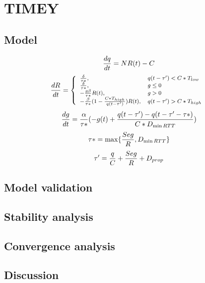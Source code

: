 \section{TIMEY}

\subsection{Model}

\begin{equation}
\small
\frac{{dq}}{{dt}} = NR(t) - C\\
\label{eq:timely_q}
\end{equation}
\begin{equation}
\small
\frac{{dR}}{{dt}} = \left\{ \begin{array}{ll}
\frac{\delta }{{\tau *}}, & q(t - \tau ') < C*{T_{low}}\\
\frac{\delta }{{\tau *}}, & g \le 0\\
 - \frac{{g\beta }}{{\tau *}}R(t), & g > 0\\
 - \frac{\beta }{{\tau *}}(1 - \frac{{C*{T_{high}}}}{{q(t - \tau ')}})R(t), & q(t - \tau ') > C*{T_{high}}
\end{array} \right.\\
\label{eq:timely_r}
\end{equation}
\begin{equation}
\small
\frac{{dg}}{{dt}} = \frac{\alpha }{{\tau *}}( - g(t) + \frac{{q(t - \tau ') - q(t - \tau ' - \tau *)}}{{C*{D_{\min RTT}}}})\\
\label{eq:timely_g}
\end{equation}
\begin{equation}
\small
\tau * = \max \{ \frac{{Seg}}{R},{D_{\min RTT}}\} \\
\label{eq:timely_taus}
\end{equation}
\begin{equation}
\small
\tau ' = \frac{q}{C} + \frac{{Seg}}{R} + {D_{prop}}
\label{eq:timely_taup}
\end{equation}

\subsection{Model validation}

\subsection{Stability analysis}


\subsection{Convergence analysis}

\subsection{Discussion}
